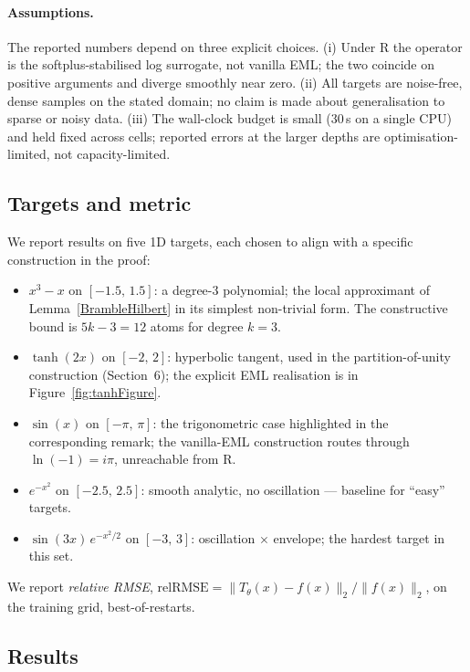 \paragraph{Assumptions.}
The reported numbers depend on three explicit choices. (i) Under R the
operator is the softplus-stabilised log surrogate, not vanilla EML; the
two coincide on positive arguments and diverge smoothly near zero. (ii)
All targets are noise-free, dense samples on the stated domain; no claim
is made about generalisation to sparse or noisy data. (iii) The
wall-clock budget is small ($30\,$s on a single CPU) and held fixed
across cells; reported errors at the larger depths are
optimisation-limited, not capacity-limited.

\subsection{Targets and metric}

We report results on five 1D targets, each chosen to align with a specific
construction in the proof:
\begin{itemize}[leftmargin=*, itemsep=2pt, topsep=2pt]
\item $x^3 - x$ on $[-1.5,\,1.5]$: a degree-$3$ polynomial; the local
  approximant of Lemma~\ref{BrambleHilbert} in its simplest non-trivial
  form. The constructive bound is $5k - 3 = 12$ atoms for degree $k = 3$.
\item $\tanh(2x)$ on $[-2,\,2]$: hyperbolic tangent, used in the
  partition-of-unity construction (Section~6); the explicit EML
  realisation is in Figure~\ref{fig:tanhFigure}.
\item $\sin(x)$ on $[-\pi,\,\pi]$: the trigonometric case highlighted in
  the corresponding remark; the vanilla-EML construction routes through
  $\ln(-1) = i\pi$, unreachable from R.
\item $e^{-x^2}$ on $[-2.5,\,2.5]$: smooth analytic, no oscillation —
  baseline for ``easy'' targets.
\item $\sin(3x)\,e^{-x^2/2}$ on $[-3,\,3]$: oscillation $\times$ envelope;
  the hardest target in this set.
\end{itemize}
We report \emph{relative RMSE},
$\mathrm{relRMSE} = \|T_\theta(x) - f(x)\|_2 / \|f(x)\|_2$,
on the training grid, best-of-restarts.

\subsection{Results}

